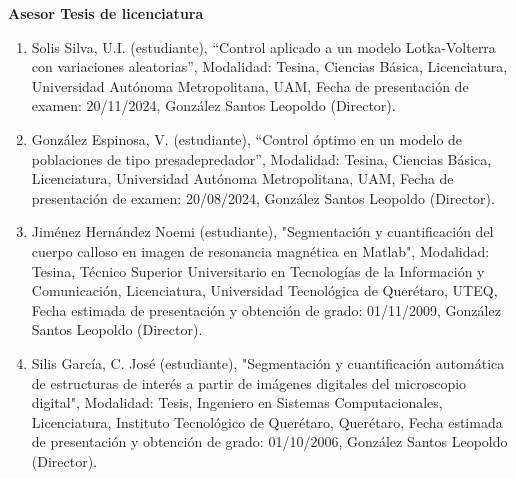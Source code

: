 \textbf{Asesor Tesis de licenciatura}

\hfill

\begin{enumerate}

\item Solis Silva, U.I. (estudiante), “Control aplicado a un modelo Lotka-Volterra con variaciones aleatorias”, Modalidad:
Tesina, Ciencias Básica, Licenciatura, Universidad Autónoma Metropolitana, UAM, Fecha de presentación de examen:
20/11/2024, González Santos Leopoldo (Director).

\item González Espinosa, V. (estudiante), “Control óptimo en un modelo de poblaciones de tipo presadepredador”, Modalidad:
Tesina, Ciencias Básica, Licenciatura, Universidad Autónoma Metropolitana, UAM, Fecha de presentación de examen:
20/08/2024, González Santos Leopoldo (Director).

\item Jiménez Hernández Noemi (estudiante), "Segmentación y cuantificación del cuerpo calloso en imagen de resonancia
magnética en Matlab", Modalidad: Tesina, Técnico Superior Universitario en Tecnologías de la Información y Comunicación,
Licenciatura, Universidad Tecnológica de Querétaro, UTEQ, Fecha estimada de presentación y obtención de grado: 01/11/2009,
González Santos Leopoldo (Director).

\item Silis García, C. José (estudiante), "Segmentación y cuantificación automática de estructuras de interés a partir de
imágenes digitales del microscopio digital", Modalidad: Tesis, Ingeniero en Sistemas Computacionales, Licenciatura,
Instituto Tecnológico de Querétaro, Querétaro, Fecha estimada de presentación y obtención de grado: 01/10/2006, González
Santos Leopoldo (Director).

\end{enumerate}
